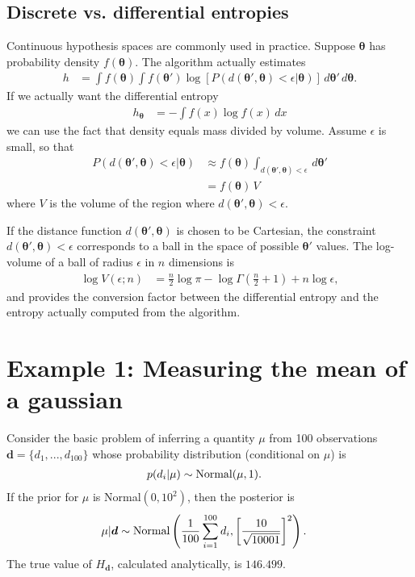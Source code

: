 \documentclass[entropy,article,accept,oneauthor,pdftex,10pt,a4paper]{mdpi}
\renewcommand{\d}{\boldsymbol{d}}
\newcommand{\x}{\boldsymbol{\theta}}
\begin{document}
\subsection{Discrete vs. differential entropies}

Continuous hypothesis spaces are commonly used in practice. Suppose
$\x$ has probability density $f(\x)$. The algorithm actually estimates
\begin{align}
h &= \int f(\x) \int f(\x')
            \log \left[ P(d(\x', \x) < \epsilon | \x) \right]
                        \, d\x' \, d\x.
\end{align}
If we actually want the differential
entropy
\begin{align}
h_{\x} &= -\int f(x) \log f(x) \, dx
\end{align}
we can use the fact that density equals mass divided
by volume. Assume $\epsilon$ is small, so that
\begin{align}
P(d(\x', \x) < \epsilon | \x)
    &\approx
    f(\x) \int_{d(\x', \x) < \epsilon} \, d\x'\\
    &= f(\x) \, V
\end{align}
where $V$ is the volume of the region where $d(\x', \x) < \epsilon$.

If the distance function $d(\x', \x)$ is chosen to be Cartesian,
the constraint $d(\x', \x) < \epsilon$ corresponds to a ball in the space
of possible $\x'$ values.
The log-volume of a ball of radius $\epsilon$ in $n$ dimensions is
\begin{align}
\log V(\epsilon; n) &= \frac{n}{2}\log \pi
                        - \log \Gamma\left(\frac{n}{2} + 1\right)
                        + n \log \epsilon,
\end{align}
and provides the conversion factor between the differential entropy and
the entropy actually computed from the algorithm.


\section{Example 1: Measuring the mean of a gaussian}

Consider the basic problem of inferring a quantity $\mu$ from
100 observations $\d = \{d_1, ..., d_{100}\}$ whose
probability distribution (conditional on $\mu$) is
\begin{align}
p(d_i | \mu) &\sim \textnormal{Normal}(\mu, 1).
\end{align}
If the prior for $\mu$ is Normal$(0, 10^2)$, then the posterior is
\begin{align}
\mu | \d &\sim \textnormal{Normal}\left(
                                       \frac{1}{100}\sum_{i=1}^{100} d_i,
                                       \left[\frac{10}{\sqrt{10001}}\right]^2
                                       \right).
\end{align}
The true value of $H_{\d}$, calculated analytically, is $146.499$.
\end{document}

